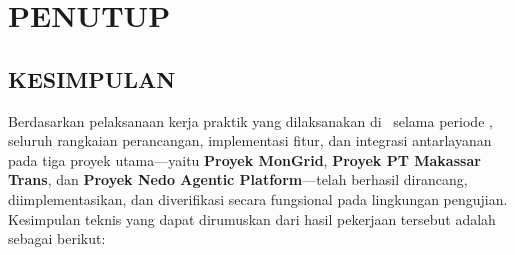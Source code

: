 \chapter{PENUTUP}

\section{KESIMPULAN}

Berdasarkan pelaksanaan kerja praktik yang dilaksanakan di \NamaPerusahaan\ selama periode \PeriodeKP, seluruh rangkaian perancangan, implementasi fitur, dan integrasi antarlayanan pada tiga proyek utama—yaitu \textbf{Proyek MonGrid}, \textbf{Proyek PT Makassar Trans}, dan \textbf{Proyek Nedo Agentic Platform}—telah berhasil dirancang, diimplementasikan, dan diverifikasi secara fungsional pada lingkungan pengujian. Kesimpulan teknis yang dapat dirumuskan dari hasil pekerjaan tersebut adalah sebagai berikut:

